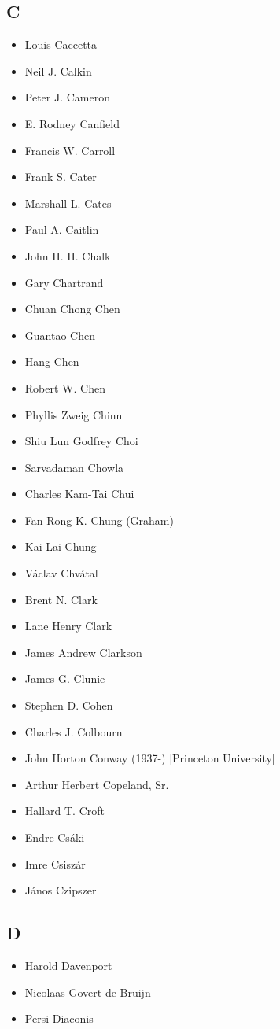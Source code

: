 \documentclass[12pt]{article}
\begin{document}
\subsection{C}
\begin{itemize}
\item Louis Caccetta
\item Neil J. Calkin
\item Peter J. Cameron
\item E. Rodney Canfield
\item Francis W. Carroll
\item Frank S. Cater
\item Marshall L. Cates
\item Paul A. Caitlin
\item John H. H. Chalk
\item Gary Chartrand
\item Chuan Chong Chen
\item Guantao Chen
\item Hang Chen
\item Robert W. Chen
\item Phyllis Zweig Chinn
\item Shiu Lun Godfrey Choi
\item Sarvadaman Chowla
\item Charles Kam-Tai Chui
\item Fan Rong K. Chung (Graham) 
\item Kai-Lai Chung
\item V\'{a}clav Chv\'{a}tal
\item Brent N. Clark
\item Lane Henry Clark
\item James Andrew Clarkson
\item James G. Clunie
\item Stephen D. Cohen
\item Charles J. Colbourn
\item John Horton Conway (1937-) [Princeton University] 
\item Arthur Herbert Copeland, Sr.
\item Hallard T. Croft
\item Endre Cs\'{a}ki
\item Imre Csisz\'{a}r
\item J\'{a}nos Czipszer
\end{itemize}

\subsection{D}
\begin{itemize}
\item Harold Davenport 
\item Nicolaas Govert de Bruijn 
\item Persi Diaconis
\end{itemize}
\end{document}
